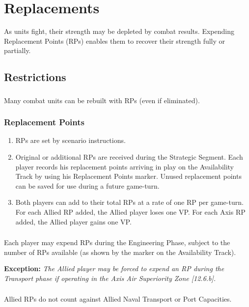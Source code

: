\section{Replacements}

As units fight, their strength may be depleted by combat results. Expending Replacement Points (RPs) enables them to recover their strength fully or partially.

\subsection{Restrictions}

\subsubsection{} Many combat units can be rebuilt with RPs (even if eliminated).

\subsubsection{\textbf{Replacement Points}}

\begin{enumerate}[label=\alph*.]
    \item RPs are set by scenario instructions.
    \item Original or additional RPs are received during the Strategic Segment. Each player records his replacement points arriving in play on the Availability Track by using his Replacement Points marker. Unused replacement points can be saved for use during a future game-turn.
    \item Both players can add to their total RPs at a rate of one RP per game-turn. For each Allied RP added, the Allied player loses one VP. For each Axis RP added, the Allied player gains one VP.
\end{enumerate}

\subsubsection{} Each player may expend RPs during the Engineering Phase, subject to the number of RPs available (as shown by the marker on the Availability Track).

\textbf{Exception:} \textit{The Allied player may be forced to expend an RP during the Transport phase if operating in the Axis Air Superiority Zone [12.6.b].}

\subsubsection{} Allied RPs do not count against Allied Naval Transport or Port Capacities.

